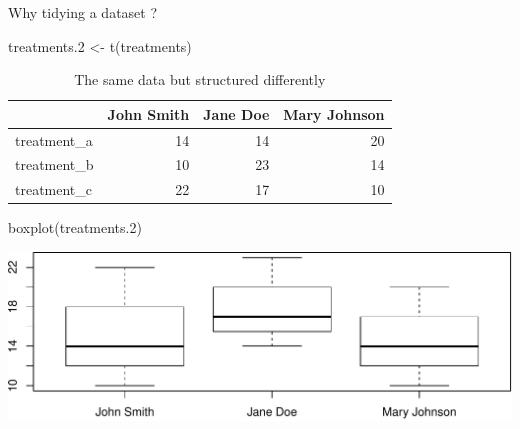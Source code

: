 \documentclass[14pt,ignorenonframetext,]{bredelebeamer}
\newenvironment{Shaded}{\begin{snugshade}}{\end{snugshade}}
\newcommand{\KeywordTok}[1]{\textcolor[rgb]{0.94,0.87,0.69}{#1}}
\newcommand{\DecValTok}[1]{\textcolor[rgb]{0.86,0.86,0.80}{#1}}
\newcommand{\StringTok}[1]{\textcolor[rgb]{0.80,0.58,0.58}{#1}}
\newcommand{\NormalTok}[1]{\textcolor[rgb]{0.80,0.80,0.80}{#1}}
\begin{document}
\begin{frame}[fragile]{Why tidying a dataset ?}

\begin{Shaded}
\begin{Highlighting}[]
\NormalTok{treatments.}\DecValTok{2}\NormalTok{ <-}\StringTok{ }\KeywordTok{t}\NormalTok{(treatments)}
\end{Highlighting}
\end{Shaded}

\begin{center}
\begin{table}[t]

\caption{\label{tab:unnamed-chunk-4}The same data but structured differently}
\centering
\begin{tabular}{lrrr}
\toprule
  & John Smith & Jane Doe & Mary Johnson\\
\midrule
\rowcolor{gray!6}  treatment\_a & 14 & 14 & 20\\
treatment\_b & 10 & 23 & 14\\
\rowcolor{gray!6}  treatment\_c & 22 & 17 & 10\\
\bottomrule
\end{tabular}
\end{table}
\end{center}

\begin{Shaded}
\begin{Highlighting}[]
\KeywordTok{boxplot}\NormalTok{(treatments.}\DecValTok{2}\NormalTok{)}
\end{Highlighting}
\end{Shaded}

\includegraphics{tidyverse_28_03_files/figure-beamer/boxplot2-1.pdf}

\end{frame}
\end{document}
